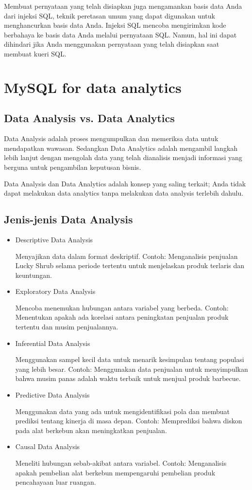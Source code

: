 \documentclass{article}
\begin{document}
Membuat pernyataan yang telah disiapkan juga mengamankan basis data Anda dari injeksi SQL, teknik peretasan umum yang dapat digunakan untuk menghancurkan basis data Anda. Injeksi SQL mencoba mengirimkan kode berbahaya ke basis data Anda melalui pernyataan SQL. Namun, hal ini dapat dihindari jika Anda menggunakan pernyataan yang telah disiapkan saat membuat kueri SQL.

\section{MySQL for data analytics}
\subsection{Data Analysis vs. Data Analytics}
Data Analysis adalah proses mengumpulkan dan memeriksa data untuk mendapatkan wawasan. Sedangkan Data Analytics adalah mengambil langkah lebih lanjut dengan mengolah data yang telah dianalisis menjadi informasi yang berguna untuk pengambilan keputusan bisnis.

Data Analysis dan Data Analytics adalah konsep yang saling terkait; Anda tidak dapat melakukan data analytics tanpa melakukan data analysis terlebih dahulu.

\subsection{Jenis-jenis Data Analysis}
\begin{itemize}
    \item Descriptive Data Analysis

          Menyajikan data dalam format deskriptif. Contoh: Menganalisis penjualan Lucky Shrub selama periode tertentu untuk menjelaskan produk terlaris dan keuntungan.
    \item Exploratory Data Analysis

          Mencoba menemukan hubungan antara variabel yang berbeda. Contoh: Menentukan apakah ada korelasi antara peningkatan penjualan produk tertentu dan musim penjualannya.
    \item Inferential Data Analysis

          Menggunakan sampel kecil data untuk menarik kesimpulan tentang populasi yang lebih besar. Contoh: Menggunakan data penjualan untuk menyimpulkan bahwa musim panas adalah waktu terbaik untuk menjual produk barbecue.
    \item Predictive Data Analysis

          Menggunakan data yang ada untuk mengidentifikasi pola dan membuat prediksi tentang kinerja di masa depan. Contoh: Memprediksi bahwa diskon pada alat berkebun akan meningkatkan penjualan.
    \item Causal Data Analysis

          Meneliti hubungan sebab-akibat antara variabel. Contoh: Menganalisis apakah pembelian alat berkebun mempengaruhi pembelian produk pencahayaan luar ruangan.
\end{itemize}
\end{document}
